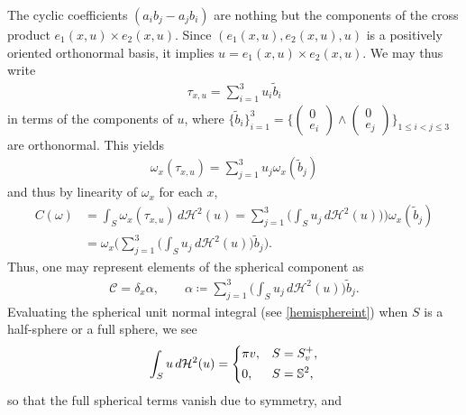 \documentclass[sn-mathphys-num]{sn-jnl}%
\theoremstyle{thmstyleone}%
\theoremstyle{thmstyletwo}%
\theoremstyle{thmstylethree}%
\numberwithin{remark}{section}
\numberwithin{definition}{section}
\numberwithin{equation}{section}
\numberwithin{theorem}{section}
\newcommand{\R}{\ensuremath{\mathbb{R}}}%
\begin{document}
The cyclic coefficients $(a_{i}b_{j} - a_{j}b_{i})$ are nothing but the components of the cross product $e_{1}(x,u) \times e_{2}(x,u)$. Since $(e_{1}(x,u),e_{2}(x,u),u)$ is a positively oriented orthonormal basis, it implies $u = e_{1}(x,u) \times e_{2}(x,u)$. We may thus write
\begin{align*}
  \tau_{x,u}  =  \sum_{i=1}^{3}{u_{i}\tilde{b}_{i}  } 
\end{align*}
in terms of the components of $u$, where $\{\tilde{b}_{i}\}_{i=1}^{3}=\bigg\{\begin{pmatrix} 0 \\ e_i  \end{pmatrix}\wedge  \begin{pmatrix} 0\\ e_j \end{pmatrix}\bigg\}_{{1\leq i<j\leq 3 }}$ are orthonormal. This yields
\begin{align*}
      \omega_{x}(\tau_{x,u}) = \sum_{j=1}^{3}{u_{j}\omega_{x}(\tilde{b}_{j})  } 
\end{align*}
and thus by linearity of $\omega_{x}$ for each $x$,
\begin{align*}
C(\omega)&=\int_{S}{\omega_{x}(\tau_{x,u})\,d\mathcal{H}^{2}(u) } =  \sum_{j=1}^{3}{\bigg(\int_{S}u_{j}\,d\mathcal{H}^{2}(u))\bigg)\omega_{x}(\tilde{b}_{j}) } \\&=  {\omega_{x}\bigg(\sum_{j=1}^{3}\bigg(\int_{S}u_{j}\,d\mathcal{H}^{2}(u)\bigg)\tilde{b}_{j}\bigg) }.
\end{align*}
Thus, one may represent elements of the spherical component as
\begin{align*}
    \mathcal{C} = \delta_{x}\alpha,\qquad \alpha\coloneq \sum_{j=1}^{3}\bigg(\int_{S}u_{j}\,d\mathcal{H}^{2}(u)\bigg)\tilde{b}_{j}.
\end{align*}
Evaluating the spherical unit normal integral  (see \cref{hemisphereint}) when $S$ is a half-sphere or a full sphere, we see
\begin{gather*}
    \int_{S}{u\,d\mathcal{H}^{2}(u) }  = \begin{dcases}
        \pi v, & S=S_{v}^{+},\\ 0, & S=\mathbb{S}^{2},
		 \end{dcases} 
\end{gather*}
so that the full spherical terms vanish due to symmetry, and
\end{document}
